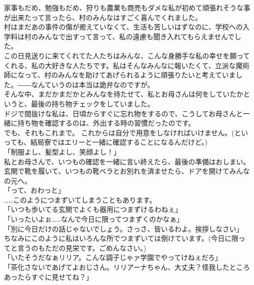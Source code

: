 \documentclass[oneside, a4paper]{jsbook}
\begin{document}
家事もだめ、勉強もだめ、狩りも農業も商売もダメな私が初めて頑張れそうな事が出来たって言ったら、村のみんなはすごく喜んでくれました。\\
村はまだあの事件の傷が癒えていなくて、生活も苦しいはずなのに、学校への入学料は村のみんなで出すって言って、私の遠慮も聞き入れてもらえませんでした。\\
この日見送りに来てくれてた人たちはみんな、こんな身勝手な私の幸せを願ってくれる、私の大好きな人たちです。私はそんなみんなに報いたくて、立派な魔術師になって、村のみんなを助けてあげられるように頑張りたいと考えていました。――なんていうのは本当は詭弁なのですが。\\

そんな中、まだかまだかとみんなを待たせて、私とお母さんは何をしていたかというと、最後の持ち物チェックをしていました。\\
ドジで間抜けな私は、日頃からすぐに忘れ物をするので、こうしてお母さんと一緒に持ち物を確認するのは、外出する時の習慣だったのです。\\
でも、それもこれまで。
これからは自分で用意をしなければいけません。(といっても、結局寮ではエリーと一緒に確認することになるんだけど。)\\

「制服よし、髪型よし、笑顔よし！」\\
私とお母さんで、いつもの確認を一緒に言い終えたら、最後の準備はおしまい。\\
玄関で靴を履いて、いつもの靴ベラとお別れを済ませたら、ドアを開けてみんなの元へ。\\

\noindent
「って、おわっと」\\

……このようにつまずいてしまうこともあります。\\

\noindent
「いつも歩いてる玄関でよくも器用につまずけるわねぇ」\\
「いったいよぉ……なんで今日に限ってつまずくのかなぁ」\\
「別に今日だけの話じゃないでしょう。さっさ、皆いるわよ。挨拶しなさい」\\

ちなみにこのように私はいろんな所でつまずいては倒けています。(今日に限ってと言うのもただの見栄です。ごめんなさい。)\\

\noindent
「いたそうだなぁリリア。こんな調子じゃァ学園でやってけねぇだろ」\\
「茶化さないであげてよおじさん。リリアーナちゃん、大丈夫？怪我したところあったらすぐに見せてね？」\\
\end{document}
